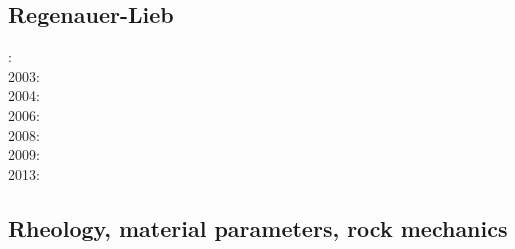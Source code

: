 \subsection{Regenauer-Lieb}

{\scriptsize
{}: \cite{reyu00}\\
2003: \cite{reyu03}\\
2004: \cite{reyu04}\\
2006: \cite{rehy06}\cite{rewr06}\\
2008: \cite{rerw08}\\
2009: \cite{reps09}\\
2013: \cite{revp13}
}

\subsection{Rheology, material parameters, rock mechanics}

